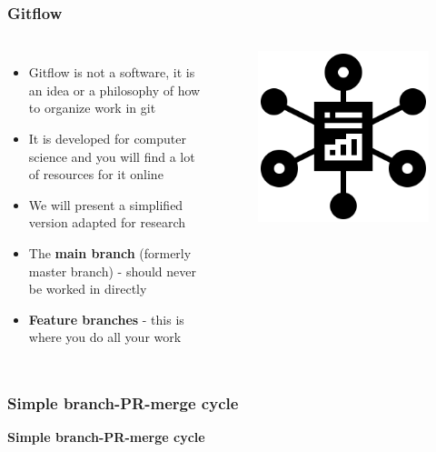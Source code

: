 \documentclass[aspectratio=169]{beamer} %
\begin{document}
\begin{frame}
	\frametitle{Gitflow}
	\begin{columns}[c]

		\begin{itemize}
			\setlength\itemsep{.5em}
			\item Gitflow is not a software,
			it is an idea or a philosophy of how to organize work in git
			\item It is developed for computer science and
			you will find a lot of resources for it online
			\item We will present a simplified version adapted for research
			\item The \textbf{main branch} (formerly master branch)
			- should never be worked in directly
			\item \textbf{Feature branches} - this is where you do all your work
		\end{itemize}

		\vspace{-.75cm}
		\begin{figure}
			\centering
			\includegraphics[width=.75\textwidth]{./img/organization.png}
		\end{figure}
	\end{columns}
\end{frame}



\begin{frame}
	\frametitle{Simple branch-PR-merge cycle}

	\huge\centering \textbf{Simple branch-PR-merge cycle}

\end{frame}
\end{document}

